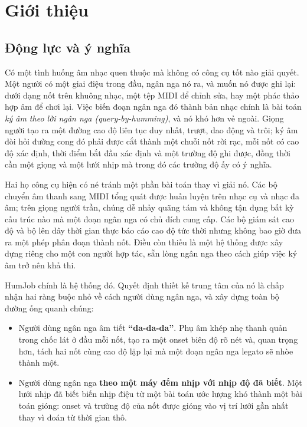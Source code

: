 \documentclass[12pt,a4paper]{article}
\begin{document}
\newpage
{}
\tableofcontents
\newpage
\listoffigures
\newpage
\listoftables
\newpage

\section{Giới thiệu}

\subsection{Động lực và ý nghĩa}

Có một tình huống âm nhạc quen thuộc mà không có công cụ tốt nào giải quyết. Một
người có một giai điệu trong đầu, ngân nga nó ra, và muốn nó được ghi lại: dưới
dạng nốt trên khuông nhạc, một tệp MIDI để chỉnh sửa, hay một phác thảo hợp âm để
chơi lại. Việc biến đoạn ngân nga đó thành bản nhạc chính là bài toán
\emph{ký âm theo lời ngân nga (query-by-humming)}, và nó khó hơn vẻ ngoài. Giọng
người tạo ra một đường cao độ liên tục duy nhất, trượt, dao động và trôi; ký âm đòi
hỏi đường cong đó phải được cắt thành một chuỗi nốt rời rạc, mỗi nốt có cao độ xác
định, thời điểm bắt đầu xác định và một trường độ ghi được, đồng thời cần một giọng
và một lưới nhịp mà trong đó các trường độ ấy có ý nghĩa.

Hai họ công cụ hiện có né tránh một phần bài toán thay vì giải nó. Các bộ chuyển âm
thanh sang MIDI tổng quát được huấn luyện trên nhạc cụ và nhạc đa âm; trên giọng
người trần, chúng dễ nhảy quãng tám và không tận dụng bất kỳ cấu trúc nào mà một
đoạn ngân nga có chủ đích cung cấp. Các bộ giám sát cao độ và bộ lên dây thời gian
thực báo cáo cao độ tức thời nhưng không bao giờ đưa ra một phép phân đoạn thành
nốt. Điều còn thiếu là một hệ thống được xây dựng riêng cho một con người hợp tác,
sẵn lòng ngân nga theo cách giúp việc ký âm trở nên khả thi.

HumJob chính là hệ thống đó. Quyết định thiết kế trung tâm của nó là chấp nhận hai
ràng buộc nhỏ về cách người dùng ngân nga, và xây dựng toàn bộ đường ống quanh
chúng:

\begin{itemize}
    \item Người dùng ngân nga âm tiết \textbf{``da-da-da''}. Phụ âm khép nhẹ thanh
    quản trong chốc lát ở đầu mỗi nốt, tạo ra một onset biên độ rõ nét và, quan
    trọng hơn, tách hai nốt cùng cao độ lặp lại mà một đoạn ngân nga legato sẽ nhòe
    thành một.
    \item Người dùng ngân nga \textbf{theo một máy đếm nhịp với nhịp độ đã biết}.
    Một lưới nhịp đã biết biến nhịp điệu từ một bài toán ước lượng khó thành một bài
    toán gióng: onset và trường độ của nốt được gióng vào vị trí lưới gần nhất thay
    vì đoán từ thời gian thô.
\end{itemize}
\end{document}
